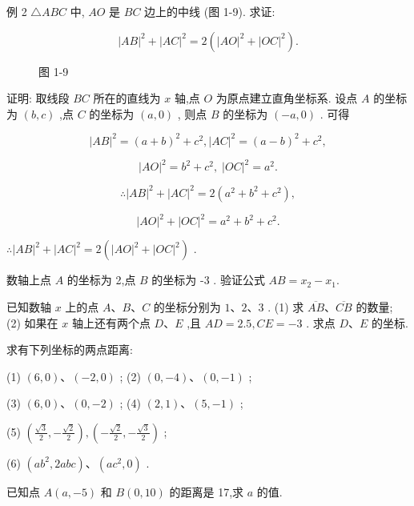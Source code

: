 \documentclass[lang=cn,newtx,12pt,scheme=chinese]{elegantbook}
\begin{document}
例 2 \(\bigtriangleup {ABC}\) 中, \({AO}\) 是 \({BC}\) 边上的中线 (图 1-9). 求证:

\[
    {\left| AB\right| }^{2} + {\left| AC\right| }^{2} = 2\left( {{\left| AO\right| }^{2} + {\left| OC\right| }^{2}}\right) .
\]

\begin{figure}[h]
  \centering
  
  \caption{图 1-9}
\end{figure}

证明: 取线段 \({BC}\) 所在的直线为 \(x\) 轴,点 \(O\) 为原点建立直角坐标系. 设点 \(A\) 的坐标为 \(\left( {b,c}\right)\) ,点 \(C\) 的坐标为 \(\left( {a,0}\right)\) , 则点 \(B\) 的坐标为 \(\left( {-a,0}\right)\) . 可得

\[
    {\left| AB\right| }^{2} = {\left( a + b\right) }^{2} + {c}^{2},{\left| AC\right| }^{2} = {\left( a - b\right) }^{2} + {c}^{2},
\]

\[
    {\left| AO\right| }^{2} = {b}^{2} + {c}^{2},\;{\left| OC\right| }^{2} = {a}^{2}.
\]

\[
  \therefore {\left| AB\right| }^{2} + {\left| AC\right| }^{2} = 2\left( {{a}^{2} + {b}^{2} + {c}^{2}}\right) ,
\]

\[
    {\left| AO\right| }^{2} + {\left| OC\right| }^{2} = {a}^{2} + {b}^{2} + {c}^{2}.
\]

\(\therefore {\left| AB\right| }^{2} + {\left| AC\right| }^{2} = 2\left( {{\left| AO\right| }^{2} + {\left| OC\right| }^{2}}\right)\) .

\begin{problemset}[练习]

\item 数轴上点 \(A\) 的坐标为 2,点 \(B\) 的坐标为 -3 . 验证公式 \({AB} = {x}_{2} - {x}_{1}.\)

\item 已知数轴 \(x\) 上的点 \(A\text{、}B\text{、}C\) 的坐标分别为 \(1\text{、}2\text{、}3\) . (1) 求 \(\overline{AB}\text{、}\overline{CB}\) 的数量; (2) 如果在 \(x\) 轴上还有两个点 \(D\text{、}E\) ,且 \({AD} = {2.5},{CE} = - 3\) . 求点 \(D\text{、}E\) 的坐标.

\item 求有下列坐标的两点距离:

(1) \(\left( {6,0}\right) \text{、}\left( {-2,0}\right)\) ; (2) \(\left( {0, - 4}\right) \text{、}\left( {0, - 1}\right)\) ;

(3) \(\left( {6,0}\right) \text{、}\left( {0, - 2}\right)\) ; (4) \(\left( {2,1}\right) \text{、}\left( {5, - 1}\right)\) ;

(5) \(\left( {\frac{\sqrt{3}}{2}, - \frac{\sqrt{2}}{2}}\right) ,\left( {-\frac{\sqrt{2}}{2}, - \frac{\sqrt{3}}{2}}\right)\) ;

(6) \(\left( {a{b}^{2},{2abc}}\right) \text{、}\left( {a{c}^{2},0}\right)\) .

\item 已知点 \(A\left( {a, - 5}\right)\) 和 \(B\left( {0,{10}}\right)\) 的距离是 17,求 \(a\) 的值.

\end{problemset}
\end{document}
